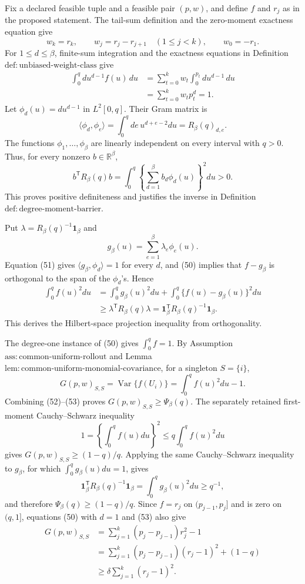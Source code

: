 Fix a declared feasible tuple and a feasible pair \((p,w)\), and define \(f\) and \(r_j\) as in the proposed statement.  The tail-sum definition and the zero-moment exactness equation give
\[
w_k=r_k,
\qquad
w_j=r_j-r_{j+1}\quad(1\le j<k),
\qquad
w_0=-r_1.
\tag{49}
\]
For \(1\le d\le\beta\), finite-sum integration and the exactness equations in Definition~\(\mathrm{def{:}unbiased\text{-}weight\text{-}class}\) give
\[
\begin{aligned}
\int_0^q d u^{d-1}f(u)\,du
&=\sum_{t=0}^kw_t\int_0^{p_t}d u^{d-1}\,du\\
&=\sum_{t=0}^kw_tp_t^d=1.
\end{aligned}
\tag{50}
\]
Let \(\phi_d(u)=d u^{d-1}\) in \(L^2[0,q]\).  Their Gram matrix is
\[
\langle\phi_d,\phi_e\rangle
=\int_0^qde\,u^{d+e-2}du
=R_\beta(q)_{d,e}.
\tag{51}
\]
The functions \(\phi_1,\ldots,\phi_\beta\) are linearly independent on every interval with \(q>0\).  Thus, for every nonzero \(b\in\mathbb R^\beta\),
\[
b^{\mathsf T}R_\beta(q)b
=\int_0^q\left\{\sum_{d=1}^\beta b_d\phi_d(u)\right\}^2du>0.
\]
This proves positive definiteness and justifies the inverse in Definition~\(\mathrm{def{:}degree\text{-}moment\text{-}barrier}\).

Put \(\lambda=R_\beta(q)^{-1}\mathbf1_\beta\) and
\[
g_\beta(u)=\sum_{e=1}^\beta\lambda_e\phi_e(u).
\]
Equation (51) gives \(\langle g_\beta,\phi_d\rangle=1\) for every \(d\), and (50) implies that \(f-g_\beta\) is orthogonal to the span of the \(\phi_d\)'s.  Hence
\[
\begin{aligned}
\int_0^q f(u)^2du
&=\int_0^q g_\beta(u)^2du
+\int_0^q\{f(u)-g_\beta(u)\}^2du\\
&\ge\lambda^{\mathsf T}R_\beta(q)\lambda
=\mathbf1_\beta^{\mathsf T}R_\beta(q)^{-1}\mathbf1_\beta.
\end{aligned}
\tag{52}
\]
This derives the Hilbert-space projection inequality from orthogonality.

The degree-one instance of (50) gives \(\int_0^qf=1\).  By Assumption~\(\mathrm{ass{:}common\text{-}uniform\text{-}rollout}\) and Lemma~\(\mathrm{lem{:}common\text{-}uniform\text{-}monomial\text{-}covariance}\), for a singleton \(S=\{i\}\),
\[
G(p,w)_{S,S}
=\operatorname{Var}\{f(U_i)\}
=\int_0^qf(u)^2du-1.
\tag{53}
\]
Combining (52)--(53) proves \(G(p,w)_{S,S}\ge\Psi_\beta(q)\).  The separately retained first-moment Cauchy--Schwarz inequality
\[
1=\left\{\int_0^qf(u)du\right\}^2
\le q\int_0^qf(u)^2du
\tag{54}
\]
gives \(G(p,w)_{S,S}\ge(1-q)/q\).  Applying the same Cauchy--Schwarz inequality to \(g_\beta\), for which \(\int_0^qg_\beta(u)du=1\), gives
\[
\mathbf1_\beta^{\mathsf T}R_\beta(q)^{-1}\mathbf1_\beta
=\int_0^qg_\beta(u)^2du\ge q^{-1},
\]
and therefore \(\Psi_\beta(q)\ge(1-q)/q\).  Since \(f=r_j\) on \((p_{j-1},p_j]\) and is zero on \((q,1]\), equations (50) with \(d=1\) and (53) also give
\[
\begin{aligned}
G(p,w)_{S,S}
&=\sum_{j=1}^k(p_j-p_{j-1})r_j^2-1\\
&=\sum_{j=1}^k(p_j-p_{j-1})(r_j-1)^2+(1-q)\\
&\ge\delta\sum_{j=1}^k(r_j-1)^2.
\end{aligned}
\tag{55}
\]

